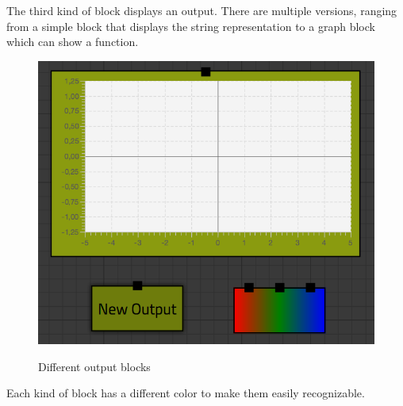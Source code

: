 The third kind of block displays an output.  
There are multiple versions, ranging from a simple block that displays the string representation to a graph block which can show a function. 

\begin{figure}[p]
	\centering
	\includegraphics[scale=0.5]{Images/blocks-outputs}
	\label{fig:blocks-outputs}
	\caption{Different output blocks}
\end{figure}

Each kind of block has a different color to make them easily recognizable.

